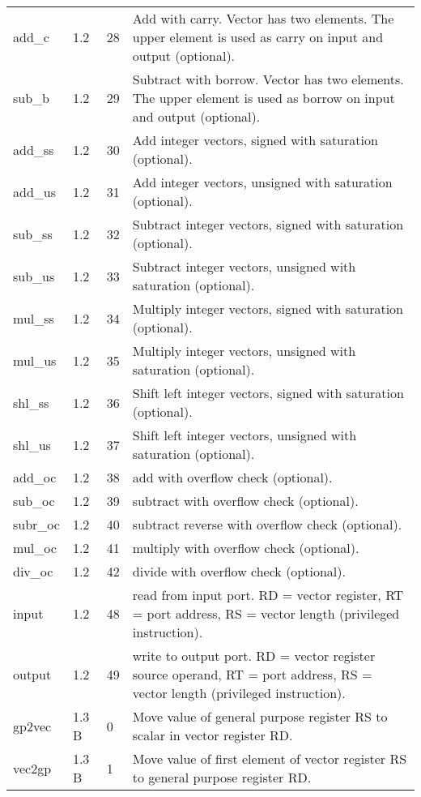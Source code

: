 \documentclass[forwardcom.tex]{subfiles}
\begin{document}
\begin{longtable} {|p{20mm}|p{10mm}|p{8mm}|p{75mm}|}
add\_c        & 1.2 & 28 & Add with carry. Vector has two elements. The upper element is used as carry on input and output (optional). \\
sub\_b        & 1.2 & 29 & Subtract with borrow. Vector has two elements. The upper element is used as borrow on input and output (optional). \\
add\_ss       & 1.2 & 30 & Add integer vectors, signed with saturation (optional). \\
add\_us       & 1.2 & 31 & Add integer vectors, unsigned with saturation (optional). \\
sub\_ss       & 1.2 & 32 & Subtract integer vectors, signed with saturation (optional). \\
sub\_us       & 1.2 & 33 & Subtract integer vectors, unsigned with saturation (optional). \\
mul\_ss       & 1.2 & 34 & Multiply integer vectors, signed with saturation (optional). \\
mul\_us       & 1.2 & 35 & Multiply integer vectors, unsigned with saturation (optional). \\
shl\_ss       & 1.2 & 36 & Shift left integer vectors, signed with saturation (optional). \\
shl\_us       & 1.2 & 37 & Shift left integer vectors, unsigned with saturation (optional). \\
add\_oc       & 1.2 & 38 & add with overflow check (optional). \\
sub\_oc       & 1.2 & 39 & subtract with overflow check (optional). \\
subr\_oc      & 1.2 & 40 & subtract reverse with overflow check (optional). \\
mul\_oc       & 1.2 & 41 & multiply with overflow check (optional). \\
div\_oc       & 1.2 & 42 & divide with overflow check (optional). \\
input         & 1.2 & 48 & read from input port. RD = vector register, RT = port address, RS = vector length (privileged instruction). \\
output        & 1.2 & 49 & write to output port. RD = vector register source operand, RT = port address, RS = vector length (privileged instruction). \\

gp2vec        & 1.3 B &  0 & Move value of general purpose register RS to scalar in vector register RD. \\

vec2gp        & 1.3 B &  1 & Move value of first element of vector register RS to general purpose register RD. \\


\end{longtable}
\end{document}
